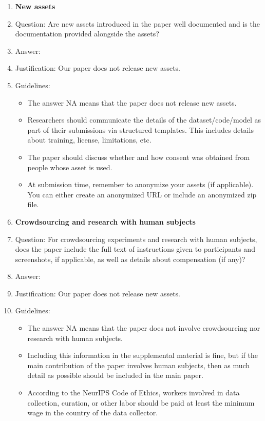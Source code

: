 \documentclass{article}
\theoremstyle{plain}
\begin{document}
\begin{enumerate}
\item {\bf New assets}
    \item[] Question: Are new assets introduced in the paper well documented and is the documentation provided alongside the assets?
    \item[] Answer: \answerNA{} %
    \item[] Justification: Our paper does not release new assets.
    \item[] Guidelines:
    \begin{itemize}
        \item The answer NA means that the paper does not release new assets.
        \item Researchers should communicate the details of the dataset/code/model as part of their submissions via structured templates. This includes details about training, license, limitations, etc. 
        \item The paper should discuss whether and how consent was obtained from people whose asset is used.
        \item At submission time, remember to anonymize your assets (if applicable). You can either create an anonymized URL or include an anonymized zip file.
    \end{itemize}

\item {\bf Crowdsourcing and research with human subjects}
    \item[] Question: For crowdsourcing experiments and research with human subjects, does the paper include the full text of instructions given to participants and screenshots, if applicable, as well as details about compensation (if any)? 
    \item[] Answer: \answerNA{} %
    \item[] Justification: Our paper does not release new assets.
    \item[] Guidelines:
    \begin{itemize}
        \item The answer NA means that the paper does not involve crowdsourcing nor research with human subjects.
        \item Including this information in the supplemental material is fine, but if the main contribution of the paper involves human subjects, then as much detail as possible should be included in the main paper. 
        \item According to the NeurIPS Code of Ethics, workers involved in data collection, curation, or other labor should be paid at least the minimum wage in the country of the data collector. 
    \end{itemize}


\end{enumerate}
\end{document}
